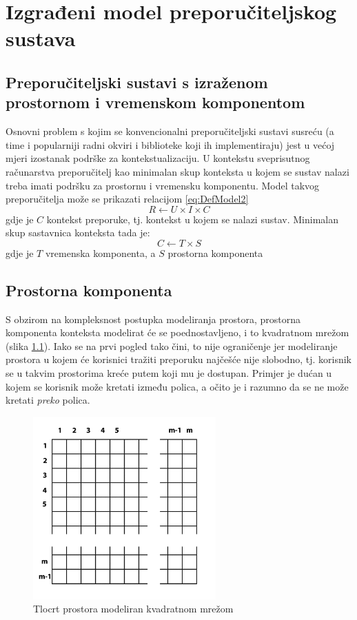 \documentclass[times, utf8, diplomski, numeric]{fer}
\begin{document}
\chapter{Izgrađeni model preporučiteljskog sustava}


\section{Preporučiteljski sustavi s izraženom prostornom i vremenskom
komponentom}

Osnovni problem s kojim se konvencionalni preporučiteljski sustavi susreću (a
time i popularniji radni okviri i biblioteke koji ih implementiraju) jest
u većoj mjeri izostanak podrške za kontekstualizaciju. U kontekstu sveprisutnog
računarstva preporučitelj kao minimalan skup konteksta u kojem se sustav nalazi
treba imati podršku za prostornu i vremensku komponentu. Model takvog
preporučitelja može se prikazati relacijom \ref{eq:DefModel2}
\begin{equation}
\label{eq:DefModel2}
	R \leftarrow U \times I \times C
\end{equation}
gdje je $C$ kontekst preporuke, tj. kontekst u kojem se nalazi sustav. Minimalan
skup sastavnica konteksta tada je:
\begin{equation}
\label{eq:Context}
	C \leftarrow T \times S
\end{equation}
gdje je $T$ vremenska komponenta, a $S$ prostorna komponenta

\section{Prostorna komponenta}

S obzirom na kompleksnost postupka modeliranja prostora, prostorna komponenta
konteksta modelirat će se poednostavljeno, i to kvadratnom mrežom
(slika \ref{fig:StoreGrid}). Iako se na prvi pogled tako čini, to nije
ograničenje jer modeliranje prostora u kojem će korisnici tražiti preporuku
najčešće nije slobodno, tj. korisnik se u takvim prostorima kreće putem koji mu
je dostupan. Primjer je dućan u kojem se korisnik može kretati između polica, a
očito je i razumno da se ne može kretati \emph{preko} polica.

\begin{figure}[H]
	\centering
	\includegraphics[width=7cm]{images/grid.png}
	\caption{Tlocrt prostora modeliran kvadratnom mrežom}
	\label{fig:StoreGrid}
\end{figure}
\end{document}
